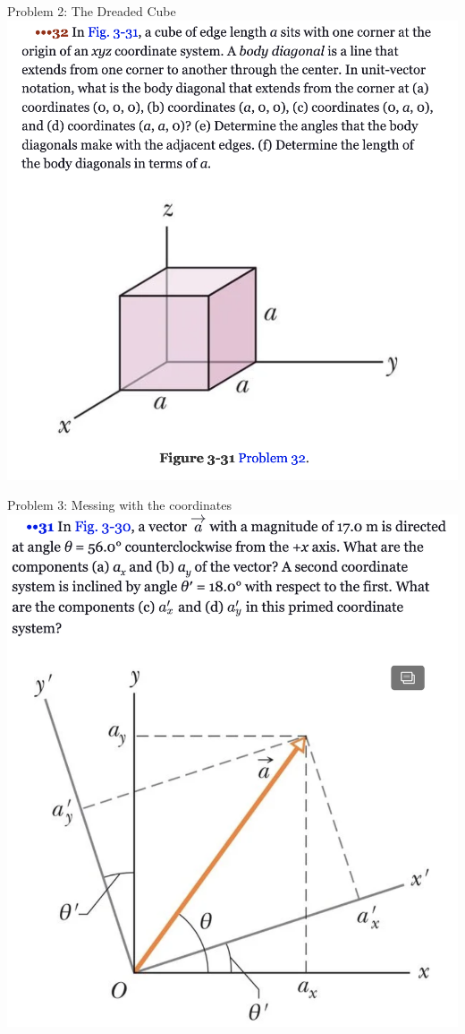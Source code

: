   \begin{frame}{Problem 2: The Dreaded Cube}
\small
\includegraphics[scale=0.34]{dreadedcube}
\end{frame}



  \begin{frame}{Problem 3: Messing with the coordinates}
\small
\includegraphics[scale=0.34]{coords}
\end{frame}

